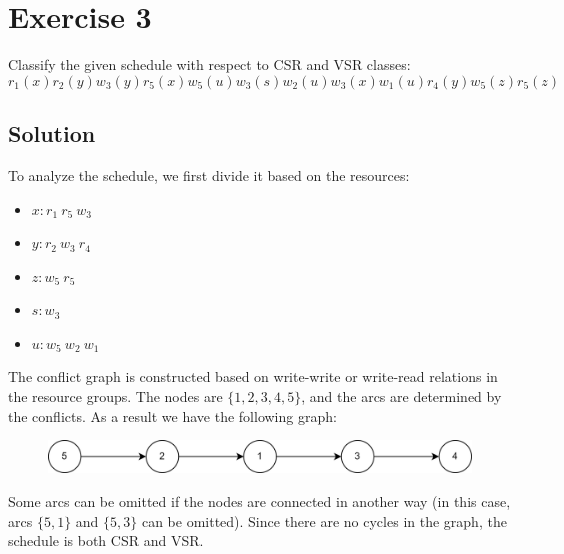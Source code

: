 \section{Exercise 3}

Classify the given schedule with respect to CSR and VSR classes:
\[r_1(x) r_2(y) w_3(y) r_5(x) w_5(u) w_3(s) w_2(u) w_3(x) w_1(u) r_4(y) w_5(z) r_5(z)\]

\subsection*{Solution}
To analyze the schedule, we first divide it based on the resources:
\begin{itemize}
    \item $x: r_1 \: r_5 \: w_3$
    \item $y: r_2 \: w_3 \: r_4$
    \item $z: w_5 \: r_5$
    \item $s: w_3$
    \item $u: w_5 \: w_2 \: w_1$
\end{itemize}
The conflict graph is constructed based on write-write or write-read relations in the resource groups. 
The nodes are $\{1,2,3,4,5\}$, and the arcs are determined by the conflicts. 
As a result we have the following graph:
\begin{figure}[H]
    \centering
    \includegraphics[width=1.0\linewidth]{images/conflictgraph.png}
\end{figure}
Some arcs can be omitted if the nodes are connected in another way (in this case, arcs $\{5,1\}$ and $\{5,3\}$ can be omitted).
Since there are no cycles in the graph, the schedule is both CSR and VSR.